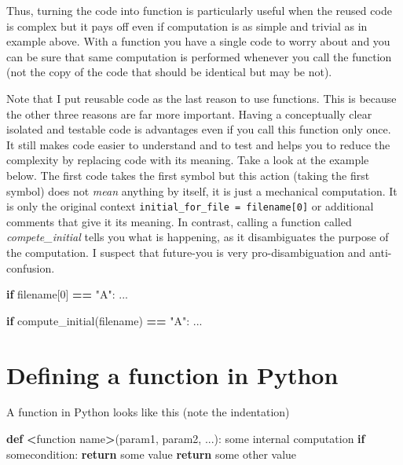 \documentclass[
]{book}
\newenvironment{Shaded}{\begin{snugshade}}{\end{snugshade}}
\newcommand{\ControlFlowTok}[1]{\textcolor[rgb]{0.13,0.29,0.53}{\textbf{#1}}}
\newcommand{\DecValTok}[1]{\textcolor[rgb]{0.00,0.00,0.81}{#1}}
\newcommand{\KeywordTok}[1]{\textcolor[rgb]{0.13,0.29,0.53}{\textbf{#1}}}
\newcommand{\NormalTok}[1]{#1}
\newcommand{\OperatorTok}[1]{\textcolor[rgb]{0.81,0.36,0.00}{\textbf{#1}}}
\newcommand{\StringTok}[1]{\textcolor[rgb]{0.31,0.60,0.02}{#1}}
\begin{document}
Thus, turning the code into function is particularly useful when the reused code is complex but it pays off even if computation is as simple and trivial as in example above. With a function you have a single code to worry about and you can be sure that same computation is performed whenever you call the function (not the copy of the code that should be identical but may be not).

Note that I put reusable code as the last reason to use functions. This is because the other three reasons are far more important. Having a conceptually clear isolated and testable code is advantages even if you call this function only once. It still makes code easier to understand and to test and helps you to reduce the complexity by replacing code with its meaning. Take a look at the example below. The first code takes the first symbol but this action (taking the first symbol) does not \emph{mean} anything by itself, it is just a mechanical computation. It is only the original context \texttt{initial\_for\_file\ =\ filename{[}0{]}} or additional comments that give it its meaning. In contrast, calling a function called \emph{compete\_initial} tells you what is happening, as it disambiguates the purpose of the computation. I suspect that future-you is very pro-disambiguation and anti-confusion.

\begin{Shaded}
\begin{Highlighting}[]
\ControlFlowTok{if}\NormalTok{ filename[}\DecValTok{0}\NormalTok{] }\OperatorTok{==} \StringTok{"A"}\NormalTok{:}
\NormalTok{    ...}
    
\ControlFlowTok{if}\NormalTok{ compute\_initial(filename) }\OperatorTok{==} \StringTok{"A"}\NormalTok{:}
\NormalTok{    ...}
\end{Highlighting}
\end{Shaded}

\hypertarget{defining-a-function-in-python}{%
\section{Defining a function in Python}\label{defining-a-function-in-python}}

A function in Python looks like this (note the indentation)

\begin{Shaded}
\begin{Highlighting}[]
\KeywordTok{def} \OperatorTok{\textless{}}\NormalTok{function name}\OperatorTok{\textgreater{}}\NormalTok{(param1, param2, ...):}
\NormalTok{    some internal computation}
    \ControlFlowTok{if}\NormalTok{ somecondition:}
        \ControlFlowTok{return}\NormalTok{ some value}
    \ControlFlowTok{return}\NormalTok{ some other value}
\end{Highlighting}
\end{Shaded}
\end{document}
